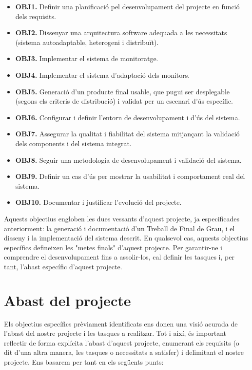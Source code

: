 \begin{itemize}
\item[] \textbf{OBJ1.} Definir una planificació pel desenvolupament del projecte en funció dels requisits.
\item[] \textbf{OBJ2.} Dissenyar una arquitectura software adequada a les necessitats (sistema autoadaptable, heterogeni i distribuït).
\item[] \textbf{OBJ3.} Implementar el sistema de monitoratge.
\item[] \textbf{OBJ4.} Implementar el sistema d'adaptació dels monitors.
\item[] \textbf{OBJ5.} Generació d’un producte final usable, que pugui ser desplegable (segons els criteris de distribució) i validat per un escenari d'ús específic.
\item[] \textbf{OBJ6.} Configurar i definir l’entorn de desenvolupament i d’ús del sistema.
\item[] \textbf{OBJ7.} Assegurar la qualitat i fiabilitat del sistema mitjançant la validació dels components i del sistema integrat.
\item[] \textbf{OBJ8.} Seguir una metodologia de desenvolupament i validació del sistema.
\item[] \textbf{OBJ9.} Definir un cas d’ús per mostrar la usabilitat i comportament real del sistema.
\item[] \textbf{OBJ10.} Documentar i justificar l’evolució del projecte.
\end{itemize}

Aquests objectius engloben les dues vessants d'aquest projecte, ja especificades anteriorment: la generació i documentació d'un Treball de Final de Grau, i el disseny i la implementació del sistema descrit. En qualsevol cas, aquests objectius específics defineixen les "metes finals" d'aquest projecte. Per garantir-ne i comprendre el desenvolupament fins a assolir-los, cal definir les tasques i, per tant, l'abast específic d'aquest projecte.


\section{Abast del projecte}

Els objectius específics prèviament identificats ens donen una visió acurada de l’abast del nostre projecte i les tasques a realitzar. Tot i així, és important reflectir de forma explícita l’abast d’aquest projecte, enumerant els requisits (o dit d’una altra manera, les tasques o necessitats a satisfer) i delimitant el nostre projecte. Ens basarem per tant en els següents punts:

